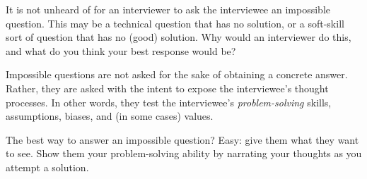 

It is not unheard of for an interviewer to ask the interviewee an impossible question.  This may be a technical question that has no solution, or a soft-skill sort of question that has no (good) solution.  Why would an interviewer do this, and what do you think your best response would be?

\vskip 50pt







Impossible questions are not asked for the sake of obtaining a concrete answer.  Rather, they are asked with the intent to expose the interviewee's thought processes.  In other words, they test the interviewee's {\it problem-solving} skills, assumptions, biases, and (in some cases) values.







The best way to answer an impossible question?  Easy: give them what they want to see.  Show them your problem-solving ability by narrating your thoughts as you attempt a solution.




